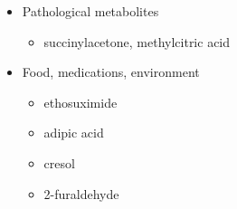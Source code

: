 \documentclass{scrartcl}
\begin{document}
\begin{enumerate}
\begin{itemize}
\item Pathological metabolites
\begin{itemize}
\item succinylacetone, methylcitric acid
\end{itemize}

\item Food, medications, environment
\begin{itemize}
\item ethosuximide
\item adipic acid
\item cresol
\item 2-furaldehyde
\end{itemize}
\end{itemize}
\end{enumerate}
\end{document}
